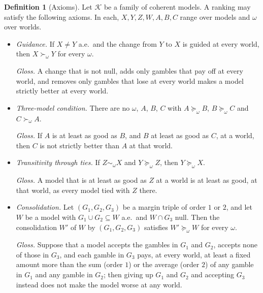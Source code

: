 \documentclass[11pt]{article}
\theoremstyle{plain}
\theoremstyle{definition}
\newtheorem{definition}[theorem]{Definition}
\begin{document}
\begin{definition}[Axioms]\label{def:axioms}
Let $\mathcal K$ be a family of coherent models. A ranking may satisfy the following axioms.
In each, $X,Y,Z,W,A,B,C$ range over models and $\omega$ over worlds.
\begin{itemize}[leftmargin=3.2em]
  \item[(A1)] \emph{Guidance.} If $X\ne Y$ a.e.\ and the change from $Y$ to $X$ is guided at
  every world, then $X\succ_\omega Y$ for every $\omega$.

  \emph{Gloss.} A change that is not null, adds only gambles that pay off at every world, and
  removes only gambles that lose at every world makes a model strictly better at every world.

  \item[(A2)] \emph{Three-model condition.} There are no $\omega$, $A$, $B$, $C$ with
  $A\succeq_\omega B$, $B\succeq_\omega C$ and $C\succ_\omega A$.

  \emph{Gloss.} If $A$ is at least as good as $B$, and $B$ at least as good as $C$, at a
  world, then $C$ is not strictly better than $A$ at that world.

  \item[(A3)] \emph{Transitivity through ties.} If $Z\sim_\omega X$ and $Y\succeq_\omega Z$,
  then $Y\succeq_\omega X$.

  \emph{Gloss.} A model that is at least as good as $Z$ at a world is at least as good, at
  that world, as every model tied with $Z$ there.

  \item[(A4)] \emph{Consolidation.} Let $(G_1,G_2,G_3)$ be a margin triple of order $1$ or
  $2$, and let $W$ be a model with $G_1\cup G_2\subseteq W$ a.e.\ and $W\cap G_3$ null. Then
  the consolidation $W'$ of $W$ by $(G_1,G_2,G_3)$ satisfies $W'\succeq_\omega W$ for every
  $\omega$.

  \emph{Gloss.} Suppose that a model accepts the gambles in $G_1$ and $G_2$, accepts none of those in
  $G_3$, and each gamble in $G_3$ pays, at every world, at least a fixed amount more than the
  sum (order $1$) or the average (order $2$) of any gamble in $G_1$ and any gamble in $G_2$;
  then giving up $G_1$ and $G_2$ and accepting $G_3$ instead does not make the model worse at
  any world.


\end{itemize}
\end{definition}
\end{document}

